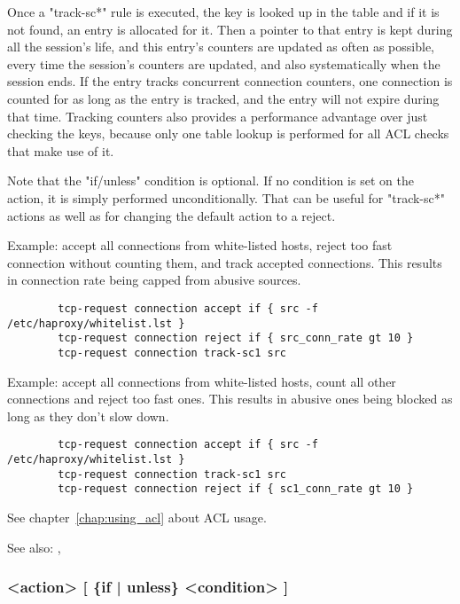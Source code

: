 \begin{itemize}
        Once a "track-sc*" rule is executed, the key is looked up in the table
        and if it is not found, an entry is allocated for it. Then a pointer to
        that entry is kept during all the session's life, and this entry's
        counters are updated as often as possible, every time the session's
        counters are updated, and also systematically when the session ends.
        If the entry tracks concurrent connection counters, one connection is
        counted for as long as the entry is tracked, and the entry will not
        expire during that time. Tracking counters also provides a performance
        advantage over just checking the keys, because only one table lookup is
        performed for all ACL checks that make use of it.
  \end{itemize}

  Note that the "if/unless" condition is optional. If no condition is set on
  the action, it is simply performed unconditionally. That can be useful for
  "track-sc*" actions as well as for changing the default action to a reject.

  Example: accept all connections from white-listed hosts, reject too fast
           connection without counting them, and track accepted connections.
           This results in connection rate being capped from abusive sources.

  \begin{verbatim}
        tcp-request connection accept if { src -f /etc/haproxy/whitelist.lst }
        tcp-request connection reject if { src_conn_rate gt 10 }
        tcp-request connection track-sc1 src
  \end{verbatim}

  Example: accept all connections from white-listed hosts, count all other
           connections and reject too fast ones. This results in abusive ones
           being blocked as long as they don't slow down.

  \begin{verbatim}
        tcp-request connection accept if { src -f /etc/haproxy/whitelist.lst }
        tcp-request connection track-sc1 src
        tcp-request connection reject if { sc1_conn_rate gt 10 }
  \end{verbatim}

  See chapter~\ref{chap:using_acl} about ACL usage.


See also: , 

\subsubsection[tcp-request content]{ <action> [ \{if | unless\} <condition> ]}

